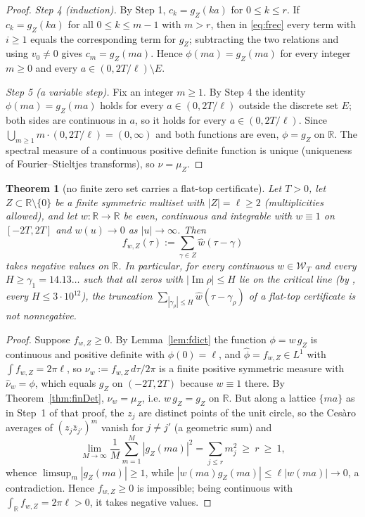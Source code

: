\documentclass[11pt]{amsart}
\newtheorem{theorem}{Theorem}[section]
\theoremstyle{definition}
\theoremstyle{remark}
\newcommand{\R}{\mathbb R}
\newcommand{\Iml}{\operatorname{Im}}
\newcommand{\nuh}{\widehat\nu}
\newcommand{\wh}{\widehat w}
\newcommand{\Wcl}{\mathcal W_T}
\begin{document}
\begin{proof}
\emph{Step 4 (induction).} By Step 1, $c_k=g_Z(ka)$ for $0\le k\le r$. If $c_k=g_Z(ka)$ for all
$0\le k\le m-1$ with $m>r$, then in \eqref{eq:frec} every term with $i\ge1$ equals the
corresponding term for $g_Z$; subtracting the two relations and using $v_0\ne0$ gives
$c_m=g_Z(ma)$. Hence $\phi(ma)=g_Z(ma)$ for every integer $m\ge0$ and every
$a\in(0,2T/\ell)\setminus E$.

\emph{Step 5 (a variable step).} Fix an integer $m\ge1$. By Step 4 the identity
$\phi(ma)=g_Z(ma)$ holds for every $a\in(0,2T/\ell)$ outside the discrete set $E$; both sides are
continuous in $a$, so it holds for every $a\in(0,2T/\ell)$. Since
$\bigcup_{m\ge1}m\cdot(0,2T/\ell)=(0,\infty)$ and both functions are even, $\phi=g_Z$ on $\R$. The
spectral measure of a continuous positive definite function is unique (uniqueness of
Fourier--Stieltjes transforms), so $\nu=\mu_Z$.
\end{proof}

\begin{theorem}[no finite zero set carries a flat-top certificate]\label{thm:finZ}
Let $T>0$, let $Z\subset\R\setminus\{0\}$ be a finite symmetric multiset with $|Z|=\ell\ge2$
(multiplicities allowed), and let $w:\R\to\R$ be even, continuous and integrable with $w\equiv1$ on
$[-2T,2T]$ and $w(u)\to0$ as $|u|\to\infty$. Then
\[
f_{w,Z}(\tau):=\sum_{\gamma\in Z}\wh(\tau-\gamma)
\]
takes negative values on $\R$. In particular, for every continuous $w\in\Wcl$ and every
$H\ge\gamma_1=14.13\ldots$ such that all zeros with $|\Iml\rho|\le H$ lie on the critical line (by
\cite{PlattTrudgian2021}, every $H\le3\cdot10^{12}$), the truncation
$\sum_{|\gamma_\rho|\le H}\wh(\tau-\gamma_\rho)$ of a flat-top certificate is not nonnegative.
\end{theorem}
\begin{proof}
Suppose $f_{w,Z}\ge0$. By Lemma~\ref{lem:fdict} the function $\phi=w\,g_Z$ is continuous and
positive definite with $\phi(0)=\ell$, and $\widehat\phi=f_{w,Z}\in L^1$ with $\int f_{w,Z}=2\pi\ell$, so
$\nu_w:=f_{w,Z}\,d\tau/2\pi$ is a finite positive symmetric measure with $\nuh_w=\phi$, which equals
$g_Z$ on $(-2T,2T)$ because $w\equiv1$ there. By Theorem~\ref{thm:finDet}, $\nu_w=\mu_Z$, i.e.
$w\,g_Z=g_Z$ on $\R$. But along a lattice $\{ma\}$ as in Step~1 of that proof, the $z_j$ are
distinct points of the unit circle, so the Ces\`aro averages of $(z_j\bar z_{j'})^m$ vanish for
$j\ne j'$ (a geometric sum) and
\[
\lim_{M\to\infty}\frac1M\sum_{m=1}^{M}|g_Z(ma)|^2=\sum_{j\le r}m_j^2\ \ge\ r\ \ge\ 1 ,
\]
whence $\limsup_m|g_Z(ma)|\ge1$, while $|w(ma)g_Z(ma)|\le\ell|w(ma)|\to0$, a contradiction. Hence
$f_{w,Z}\ge0$ is impossible; being continuous with $\int_\R f_{w,Z}=2\pi\ell>0$, it takes negative
values.
\end{proof}
\end{document}
